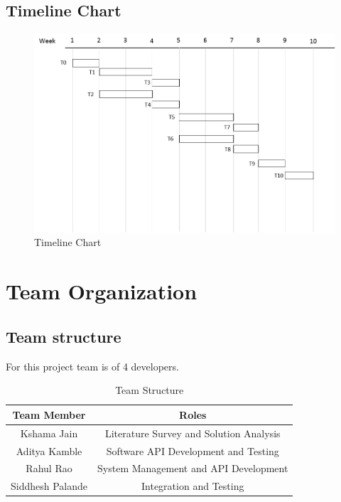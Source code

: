 \documentclass[oneside,a4paper,12pt]{report}
\begin{document}
\subsection{Timeline Chart}
\begin{figure}[H]
\includegraphics{timeline_chart}
\caption{Timeline Chart}
\end{figure}

\section{Team Organization}
\subsection{Team structure}
For this project team is of 4 developers. 
\begin{table}[!htbp]
\begin{center}
\def\arraystretch{1.5}
  \begin{tabular}{| c | c |}
       \hline
       
Team Member & Roles \\ \hline
Kshama Jain & Literature Survey and Solution Analysis \\ \hline
Aditya Kamble & Software API Development and Testing \\ \hline
Rahul Rao & System Management and API Development \\ \hline
Siddhesh Palande & Integration and Testing \\ \hline
       
\end{tabular}
 \caption { Team Structure }
 \label{tab:hreq}
\end{center}

\end{table}
\end{document}
